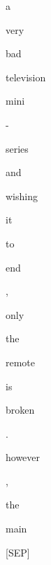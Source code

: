 \documentclass[varwidth=150mm]{standalone}
\begin{document}
\begin{CJK*}{UTF8}{gbsn}
{{{\colorbox{red!0.0}{\strut a} \colorbox{red!0.0}{\strut very} \colorbox{red!0.0}{\strut bad} \colorbox{red!0.0}{\strut television} \colorbox{red!0.0}{\strut mini} \colorbox{red!0.0}{\strut -} \colorbox{red!0.0}{\strut series} \colorbox{red!0.0}{\strut and} \colorbox{red!0.0}{\strut wishing} \colorbox{red!0.0}{\strut it} \colorbox{red!0.0}{\strut to} \colorbox{red!0.0}{\strut end} \colorbox{red!0.0}{\strut ,} \colorbox{red!0.0}{\strut only} \colorbox{red!0.0}{\strut the} \colorbox{red!1.4502679109573364}{\strut remote} \colorbox{red!0.0}{\strut is} \colorbox{red!0.0}{\strut broken} \colorbox{red!0.0}{\strut .} \colorbox{red!1.3603779077529907}{\strut however} \colorbox{red!0.0}{\strut ,} \colorbox{red!5.713421821594238}{\strut the} \colorbox{red!100.0}{\strut main} \colorbox{red!2.2167365550994873}{\strut [SEP]}
}}}
\end{CJK*}
\end{document}
